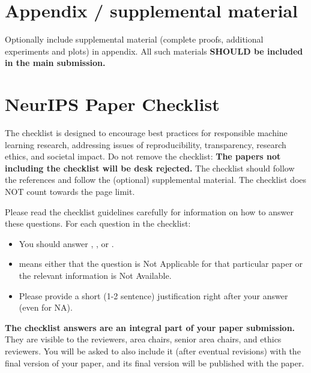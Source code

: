 \documentclass{article}
\begin{document}
\appendix %

\section{Appendix / supplemental material}

Optionally include supplemental material (complete proofs, additional experiments and plots) in appendix. All such materials \textbf{SHOULD be included in the main submission.}

\newpage

\section*{NeurIPS Paper Checklist} %


The checklist is designed to encourage best practices for responsible machine learning research, addressing issues of reproducibility, transparency, research ethics, and societal impact. Do not remove the checklist: {\bf The papers not including the checklist will be desk rejected.} The checklist should follow the references and follow the (optional) supplemental material. The checklist does NOT count towards the page limit.

Please read the checklist guidelines carefully for information on how to answer these questions. For each question in the checklist:

\begin{itemize}
    \item You should answer \answerYes{}, \answerNo{}, or \answerNA{}.
    \item \answerNA{} means either that the question is Not Applicable for that particular paper or the relevant information is Not Available.
    \item Please provide a short (1-2 sentence) justification right after your answer (even for NA).
\end{itemize}

{\bf The checklist answers are an integral part of your paper submission.} They are visible to the reviewers, area chairs, senior area chairs, and ethics reviewers. You will be asked to also include it (after eventual revisions) with the final version of your paper, and its final version will be published with the paper.
\end{document}
